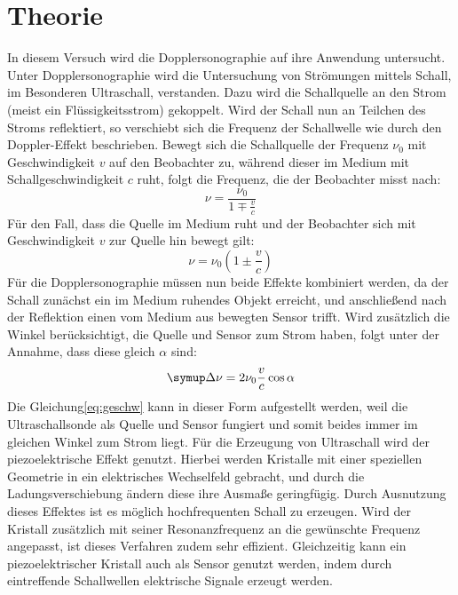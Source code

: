 \section{Theorie}
\label{sec:Theorie}
In diesem Versuch wird die Dopplersonographie auf ihre Anwendung untersucht.
Unter Dopplersonographie wird die Untersuchung von Strömungen mittels Schall, im Besonderen Ultraschall, verstanden.
Dazu wird die Schallquelle an den Strom (meist ein Flüssigkeitsstrom) gekoppelt.
Wird der Schall nun an Teilchen des Stroms reflektiert, so verschiebt sich die Frequenz der Schallwelle wie durch den
Doppler-Effekt beschrieben.
Bewegt sich die Schallquelle der Frequenz $\nu_0$ mit Geschwindigkeit $v$ auf den Beobachter zu,
während dieser im Medium mit Schallgeschwindigkeit $c$ ruht, folgt die Frequenz, die der Beobachter misst nach:
\begin{equation}
	\nu = \frac{\nu_0}{1 \mp \frac{v}{c}}
\end{equation}
Für den Fall, dass die Quelle im Medium ruht und der Beobachter sich mit Geschwindigkeit $v$ zur Quelle hin bewegt gilt:
\begin{equation}
	\nu = \nu_0\left(1\pm\frac{v}{c}\right)
\end{equation}
Für die Dopplersonographie müssen nun beide Effekte kombiniert werden, da der Schall zunächst ein im Medium ruhendes Objekt erreicht,
und anschließend nach der Reflektion einen vom Medium aus bewegten Sensor trifft.
Wird zusätzlich die Winkel berücksichtigt, die Quelle und Sensor zum Strom haben, folgt unter der Annahme, dass diese gleich $\alpha$ sind:
\begin{equation}
	\label{eq:geschw}
	\symup\Delta\nu = 2\nu_0\frac{v}{c}\cos \alpha
\end{equation}
Die Gleichung\eqref{eq:geschw} kann in dieser Form aufgestellt werden, weil die Ultraschallsonde als Quelle und Sensor fungiert und somit beides immer im gleichen Winkel zum Strom liegt.
Für die Erzeugung von Ultraschall wird der piezoelektrische Effekt genutzt.
Hierbei werden Kristalle mit einer speziellen Geometrie in ein elektrisches Wechselfeld gebracht,
und durch die Ladungsverschiebung ändern diese ihre Ausmaße geringfügig.
Durch Ausnutzung dieses Effektes ist es möglich hochfrequenten Schall zu erzeugen.
Wird der Kristall zusätzlich mit seiner Resonanzfrequenz an die gewünschte Frequenz angepasst,
ist dieses Verfahren zudem sehr effizient.
Gleichzeitig kann ein piezoelektrischer Kristall auch als Sensor genutzt werden, indem durch eintreffende Schallwellen
elektrische Signale erzeugt werden.
